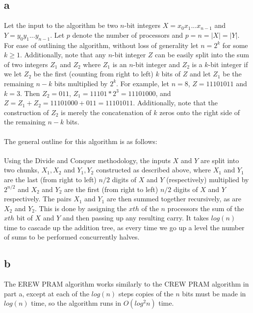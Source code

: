 \documentclass[letterpaper,notitlepage,twoside]{article}
\begin{document}
\subsection*{a}
Let the input to the algorithm be two $n$-bit integers $X = x_0x_1...x_{n-1}$ and $Y = y_0y_1...y_{n-1}$. Let $p$ denote the number of processors and $p = n = |X| = |Y|$. For ease of outlining the algorithm, without loss of generality let $n = 2^k$ for some $k \geq 1$. Additionally, note that any $n$-bit integer $Z$ can be easily split into the sum of two integers $Z_1$ and $Z_2$ where $Z_1$ is an $n$-bit integer and $Z_2$ is a $k$-bit integer if we let $Z_2$ be the first (counting from right to left) $k$ bits of $Z$ and let $Z_1$ be the remaining $n-k$ bits multiplied by $2^{k}$. For example, let $n = 8$, $Z = 11101011$ and $k = 3$. Then $Z_2= 011$, $Z_1 = 11101 * 2^{3} = 11101000$, and $Z = Z_1 + Z_2 = 11101000 + 011 = 11101011$. Additionally, note that the construction of $Z_2$ is merely the concatenation of $k$ zeros onto the right side of the remaining $n-k$ bits. 
\\\\
The general outline for this algorithm is as follows:
\\\\
Using the Divide and Conquer methodology, the inputs $X$ and $Y$ are split into two chunks, $X_1, X_2$ and $Y_1, Y_2$ constructed as described above, where $X_1$ and $Y_1$ are the last (from right to left) $n/2$ digits of $X$ and $Y$ (respectively) multiplied by $2^{n/2}$ and $X_2$ and $Y_2$ are the first (from right to left) $n/2$ digits of $X$ and $Y$ respectively. The pairs $X_1$ and $Y_1$ are then summed together recursively, as are $X_2$ and $Y_2$. This is done by assigning the $xth$ of the $n$ processors the sum of the $xth$ bit of $X$ and $Y$ and then passing up any resulting carry. It takes $log(n)$ time to cascade up the addition tree, as every time we go up a level the number of sums to be performed concurrently halves.
\subsection*{b}
The EREW PRAM algorithm works similarly to the CREW PRAM algorithm in part a, except at each of the $log(n)$ steps copies of the $n$ bits must be made in $log(n)$ time, so the algorithm runs in $O(log^{2} n)$ time.
\end{document}
